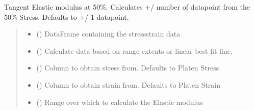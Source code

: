 \documentclass[letterpaper,10pt,english]{sphinxmanual}
\begin{document}
\begin{fulllineitems}
\begin{fulllineitems}
\end{fulllineitems}


\begin{fulllineitems}
\label{\detokenize{pyfdempp:pyfdempp.pyfdempp.Model.Etan50_mod}}
\pysigstartsignatures
{}
\pysigstopsignatures
\sphinxAtStartPar
Tangent Elastic modulus at 50\%. Calculates +/\sphinxhyphen{} number of datapoint from the 50\% Stress. Defaults to +/\sphinxhyphen{} 1 datapoint.
\begin{quote}\begin{description}
\begin{itemize}
\item {} 
\sphinxAtStartPar
{} () \textendash{} DataFrame containing the stress\sphinxhyphen{}strain data

\item {} 
\sphinxAtStartPar
{} () \textendash{} Calculate data based on range extents or linear best fit line.

\item {} 
\sphinxAtStartPar
{} () \textendash{} Column to obtain stress from. Defaults to Platen Stress

\item {} 
\sphinxAtStartPar
{} () \textendash{} Column to obtain strain from. Defaults to Platen Strain

\item {} 
\sphinxAtStartPar
{} () \textendash{} Range over which to calculate the Elastic modulus


\end{itemize}
\end{description}
\end{quote}
\end{fulllineitems}
\end{fulllineitems}
\end{document}
